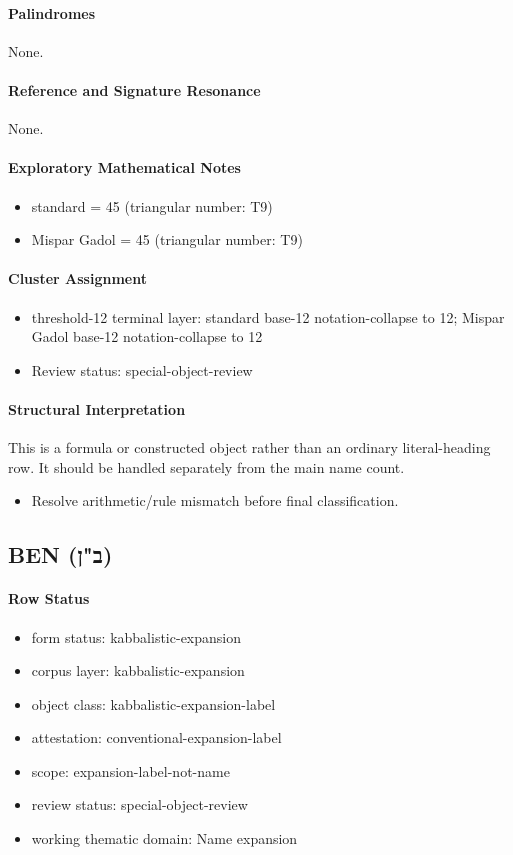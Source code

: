 \paragraph{Palindromes}
None.
\paragraph{Reference and Signature Resonance}
None.
\paragraph{Exploratory Mathematical Notes}
\begin{itemize}
\item standard = 45 (triangular number: T9)
\item Mispar Gadol = 45 (triangular number: T9)
\end{itemize}
\paragraph{Cluster Assignment}
\begin{itemize}
\item threshold-12 terminal layer: standard base-12 notation-collapse to 12; Mispar Gadol base-12 notation-collapse to 12
\item Review status: special-object-review
\end{itemize}
\paragraph{Structural Interpretation}
This is a formula or constructed object rather than an ordinary literal-heading row. It should be handled separately from the main name count.

\begin{itemize}
\item Resolve arithmetic/rule mismatch before final classification.
\end{itemize}

\subsection{BEN (ב"ן)}
\paragraph{Row Status}
\begin{itemize}
\item form status: kabbalistic-expansion
\item corpus layer: kabbalistic-expansion
\item object class: kabbalistic-expansion-label
\item attestation: conventional-expansion-label
\item scope: expansion-label-not-name
\item review status: special-object-review
\item working thematic domain: Name expansion
\end{itemize}
